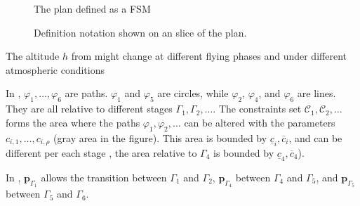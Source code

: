 \begin{figure}[h]
  \center
  \caption{The plan defined as a FSM}
  \label{fig:state-machine}
\end{figure}

\begin{figure}[t]
    \centering
    
    \caption[Definition notation on a slice of the plan]{Definition notation shown on an slice of the plan.}
    \label{fig:traj1}
\end{figure}

The altitude $h$ from  might change at different flying phases and under different atmospheric conditions

In , $\varphi_1,\dots,\varphi_6$ are paths. $\varphi_1$ and $\varphi_5$ are circles, while $\varphi_2$, $\varphi_4$, and $\varphi_6$ are lines. They are all relative to different stages $\Gamma_1,\Gamma_2,\dots$. The constraints set $\mathcal{C}_1,\mathcal{C}_2,\dots$ forms the area where the paths $\varphi_1,\varphi_2,\dots$ can be altered with the parameters $c_{i,1},\dots,c_{i,\rho}$ (gray area in the figure). This area is bounded by $\underline{c}_i,\overline{c}_i$, and can be different per each stage , the area relative to $\Gamma_4$ is bounded by $\underline{c}_4,\overline{c}_4$).

In , $\mathbf{p}_{\Gamma_1}$ allows the transition between $\Gamma_1$ and $\Gamma_2$, $\mathbf{p}_{\Gamma_4}$ between $\Gamma_4$ and $\Gamma_5$, and $\mathbf{p}_{\Gamma_5}$ between $\Gamma_5$ and $\Gamma_6$.

